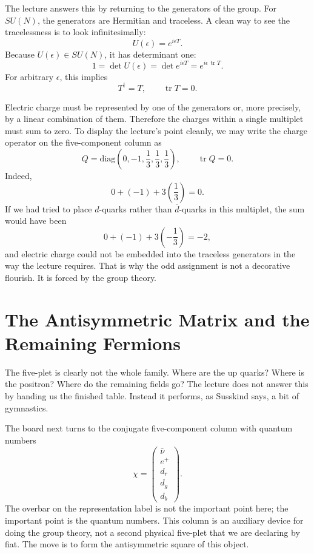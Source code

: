 The lecture answers this by returning to the generators of the group. For \(SU(N)\), the generators are Hermitian and traceless. A clean way to see the tracelessness is to look infinitesimally:
\begin{equation}
U(\epsilon)=e^{i\epsilon T}.
\end{equation}
Because \(U(\epsilon)\in SU(N)\), it has determinant one:
\begin{equation}
1=\det U(\epsilon)=\det e^{i\epsilon T}=e^{i\epsilon\,\operatorname{tr}T}.
\end{equation}
For arbitrary \(\epsilon\), this implies
\begin{equation}
T^\dagger=T,\qquad \operatorname{tr}T=0.
\end{equation}

Electric charge must be represented by one of the generators or, more precisely, by a linear combination of them. Therefore the charges within a single multiplet must sum to zero. To display the lecture's point cleanly, we may write the charge operator on the five-component column as
\begin{equation}
Q=\mathrm{diag}\!\left(0,-1,\frac13,\frac13,\frac13\right),
\qquad
\operatorname{tr}Q=0.
\end{equation}
Indeed,
\begin{equation}
0+(-1)+3\left(\frac13\right)=0.
\end{equation}
If we had tried to place \(d\)-quarks rather than \(\bar d\)-quarks in this multiplet, the sum would have been
\[
0+(-1)+3\left(-\frac13\right)=-2,
\]
and electric charge could not be embedded into the traceless generators in the way the lecture requires. That is why the odd assignment is not a decorative flourish. It is forced by the group theory.

\section{The Antisymmetric Matrix and the Remaining Fermions}

The five-plet is clearly not the whole family. Where are the up quarks? Where is the positron? Where do the remaining fields go? The lecture does not answer this by handing us the finished table. Instead it performs, as Susskind says, a bit of gymnastics.

The board next turns to the conjugate five-component column with quantum numbers
\begin{equation}
\chi=
\begin{pmatrix}
\bar\nu\\
e^+\\
d_r\\
d_g\\
d_b
\end{pmatrix}.
\end{equation}
The overbar on the representation label is not the important point here; the important point is the quantum numbers. This column is an auxiliary device for doing the group theory, not a second physical five-plet that we are declaring by fiat. The move is to form the antisymmetric square of this object.

